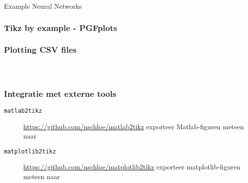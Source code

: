 \begin{frame}{Example Neural Networks}
\end{frame}



\subsubsection{Tikz by example - PGFplots}

\begin{frame}
  \frametitle{Plotting CSV files}
  \begin{columns}
      \begin{column}{.4\textwidth}
        \inputminted[lastline = 10]{latex}{tikz/pgfplots/data.dat}
    \end{column}
    \begin{column}{.6\textwidth}
      \begin{flushright}
      \end{flushright}
    \end{column}
  \end{columns}
\end{frame}


\begin{frame}
  \frametitle{Integratie met externe tools}

  \begin{description}
    \item[\texttt{matlab2tikz}] \url{https://github.com/nschloe/matlab2tikz}
      exporteer Matlab-figuren meteen naar \TikZ
    \pause
    \item[\texttt{matplotlib2tikz}] \url{https://github.com/nschloe/matplotlib2tikz}
      exporteer matplotlib-figuren meteen naar \TikZ
  \end{description}
\end{frame}


